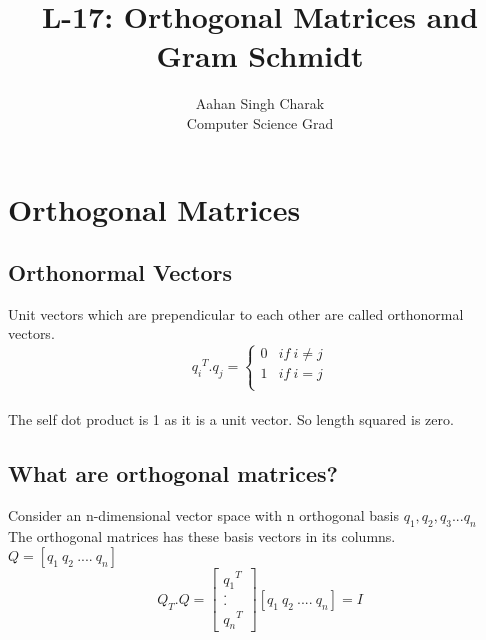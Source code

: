 \documentclass[]{article}
\title{L-17: Orthogonal Matrices and Gram Schmidt}
\author{Aahan Singh Charak\\Computer Science Grad}
\begin{document}
	\maketitle
	\section{Orthogonal Matrices}
	\vspace{10pt}
	
	\subsection{Orthonormal Vectors}
	\vspace{10pt}
	Unit vectors which are prependicular to each other are called orthonormal vectors.\\
	
	\noindent
	\[ 
	{q_i}^T.q_j=
	\begin{cases} 
		0 & if \ i\neq j \\
		1 & if \ i=j \\ 
	\end{cases}
	\]\\
	
	\noindent
	The self dot product is 1 as it is a unit vector. So length squared is zero.\\
	
	\vspace{10pt}
	\subsection{What are orthogonal matrices?}
	\vspace{10pt}
	
	Consider an n-dimensional vector space with n orthogonal basis $q_1,q_2,q_3...q_n$\\
	
	\noindent
	The orthogonal matrices has these basis vectors in its columns.\\
	
	\noindent
	$Q=[q_1  \ q_2 \ .... \ q_n]$\\
	
	\noindent
	\[
	Q_T.Q=\begin{bmatrix}
		{q_1}^T\\
		.\\
		.\\
		{q_n}^T
	\end{bmatrix}[q_1  \ q_2 \ .... \ q_n]=I
	\]\\
	
\end{document}
